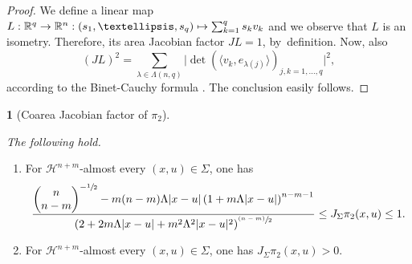 \documentclass[11pt]{article}
\newcounter{cdrthm}[section]
\theoremstyle{definition}
\theoremstyle{jepanonymous}
\newtheorem{jepempty}[cdrthm]{}
\newenvironment{enonce}[2][remark]{\begin{jepempty}[#2]}{\end{jepempty}}
\theoremstyle{plain}
\newcommand\mto{\mathchoice{\longmapsto}{\mapsto}{\mapsto}{\mapsto}}
\newcommand{\psfrac}[2]{\sfrac{(#1)}{#2}}
\newenvironment{Empty}[2][\null]{%
\begin{enonce}[remark]{#1}#2}
{\end{enonce}}
\newcommand{\R}{\mathbb{R}}
\newcommand{\Rn}{\R^n}
\newcommand{\calH}{\mathscr{H}}
\newcommand{\bin}[2]{
\begin{pmatrix} #1 \\
#2
\end{pmatrix}}
\let\la\langle
\let\ra\rangle
\begin{document}
\begin{proof}
We define a linear map $L: \R^q \to \Rn: (s_1,\ldots,s_q) \mto \sum_{k=1}^q s_k v_k$ and we observe that $L$ is an isometry.
Therefore, its area Jacobian factor $JL=1$, by~definition.
Now, also
\begin{equation*}
(JL)^2 = \sum_{\lambda \in \Lambda(n,q)}\bigl| \det \left(\la v_k, e_{\lambda(j)} \ra \right)_{j,k=1,\ldots,q}\bigr|^2,
\end{equation*}
according to the Binet-Cauchy formula \cite[Chap.\,3, \S 2, Th.\,4]{EVANS.GARIEPY}.
The conclusion easily follows.
\end{proof}

\pagebreak[2]
\begin{Empty}[Coarea Jacobian factor of $\pi_2$]
\label{factor.pi.2}
{\it
The following hold.
\begin{enumerate}
\item\label{enum:24.1}
For $\calH^{n+m}$-almost every $(x,u) \in \Sigma$, one has
\begin{equation*}
\frac{\bin{n}{n-m}^{-\sfrac{1}{2}} - m(n-m) \Lambda |x-u| \left(1 + m \Lambda |x-u|\right)^{n-m-1}}{\left(2 + 2 m \Lambda |x-u| + m^2\Lambda^2|x-u|^2 \right)^{\psfrac{n-m}{2}}} \leq J_\Sigma \pi_2(x,u) \leq 1.
\end{equation*}
\item\label{enum:24.2}
For $\calH^{n+m}$-almost every $(x,u) \in \Sigma$, one has $J_\Sigma \pi_2(x,u) > 0$.
\end{enumerate}
}
\end{Empty}
\end{document}
